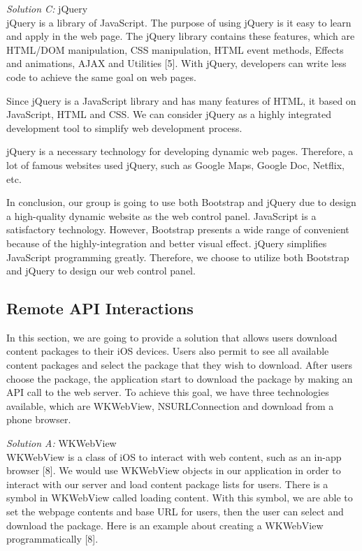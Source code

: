\documentclass[letterpaper, 10pt,titlepage]{article}
\begin{document}
\textit{Solution C:} jQuery\\
jQuery is a library of JavaScript. The purpose of using jQuery is it easy to learn and apply in the web page. The jQuery library contains these features, which are HTML/DOM manipulation, CSS manipulation, HTML event methods, Effects and animations, AJAX and Utilities [5]. With jQuery, developers can write less code to achieve the same goal on web pages. 


Since jQuery is a JavaScript library and has many features of HTML, it based on JavaScript, HTML and CSS. We can consider jQuery as a highly integrated development tool to simplify web development process.


jQuery is a necessary technology for developing dynamic web pages. Therefore, a lot of famous websites used jQuery, such as Google Maps, Google Doc, Netflix, etc. 


In conclusion, our group is going to use both Bootstrap and jQuery due to design a high-quality dynamic website as the web control panel. JavaScript is a satisfactory technology. However, Bootstrap presents a wide range of convenient because of the highly-integration and better visual effect. jQuery simplifies JavaScript programming greatly. Therefore, we choose to utilize both Bootstrap and jQuery to design our web control panel.


\subsection{Remote API Interactions}
In this section, we are going to provide a solution that allows users download content packages to their iOS devices. Users also permit to see all available content packages and select the package that they wish to download. After users choose the package, the application start to download the package by making an API call to the web server. To achieve this goal, we have three technologies available, which are WKWebView, NSURLConnection and download from a phone browser.


\textit{Solution A:} WKWebView\\
WKWebView is a class of iOS to interact with web content, such as an in-app browser [8]. We would use WKWebView objects in our application in order to interact with our server and load content package lists for users. There is a symbol in WKWebView called loading content. With this symbol, we are able to set the webpage contents and base URL for users, then the user can select and download the package. Here is an example about creating a WKWebView programmatically [8].
\end{document}
